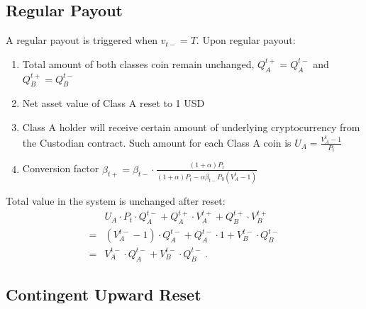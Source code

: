 \documentclass[draft, noinfoline]{ectaart}
\numberwithin{equation}{section}
\theoremstyle{plain}
\begin{document}
\begin{appendices}
\subsection{Regular Payout}\label{subsec:Periodic-Reset}

A regular payout is triggered when $v_{t-}=T$. Upon regular payout:
\begin{enumerate}
\item Total amount of both classes coin remain unchanged, $Q_{A}^{t+}=Q_{A}^{t-}$ and $Q_{B}^{t+}=Q_{B}^{t-}$
\item Net asset value of Class A reset to 1 USD
\item Class A holder will receive certain amount of underlying cryptocurrency from the Custodian contract. Such amount for each Class A coin is $U_{A}=\frac{V_{A}^{t}-1}{P_{t}}$
\item Conversion factor $\beta_{t+}=\beta_{t-}\cdot\frac{\left(1+\alpha\right) P_{t}}{\left(1+\alpha\right) P_{t}-\alpha\beta_{t-} P_{0}\left(V_{A}^{t}-1\right)}$
\end{enumerate}
Total value in the system is unchanged after reset:
\begin{align*}
 & U_{A}\cdot P_{t}\cdot Q_{A}^{t-}+Q_{A}^{t+}\cdot V_{A}^{t+}+Q_{B}^{t+}\cdot V_{B}^{t+}\\
= & \left(V_{A}^{t-}-1\right)\cdot Q_{A}^{t-}+Q_{A}^{t-}\cdot1+V_{B}^{t-}\cdot Q_{B}^{t-}\\
= & V_{A}^{t-}\cdot Q_{A}^{t-}+V_{B}^{t-}\cdot Q_{B}^{t-}\ .
\end{align*}



\subsection{Contingent Upward Reset\label{subsec:Contingent-Upward-Reset}}


\end{appendices}
\end{document}

